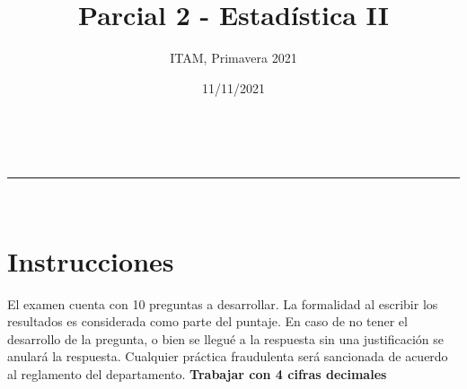 \documentclass[addpoints]{exam}
\makeatletter
\newcommand{\linia}{\rule{\linewidth}{0.5pt}}
\theoremstyle{mytheor}
\renewcommand{\maketitle}{
    \begin{center}
    \vspace{2ex}
    {\huge \textsc{\@title}}
    \vspace{1ex}
    \\
    \linia\\
    \@author \hfill \@date
    \vspace{4ex}
    \end{center}
  }
\makeatother
\begin{document}
  
  \title{Parcial 2 - Estadística II}
  
  \author{ITAM, Primavera 2021}
  
  \date{11/11/2021}
  
  \maketitle
  
  \section*{Instrucciones}
  
  El examen cuenta con 10 preguntas a desarrollar. La formalidad al escribir los resultados es considerada como parte del puntaje. En caso de no tener el desarrollo de la pregunta, o bien se llegué a la respuesta sin una justificación se anulará la respuesta. Cualquier práctica fraudulenta será sancionada de acuerdo al reglamento del departamento. \textbf{Trabajar con 4 cifras decimales}

\vspace{10pt}
\end{document}
